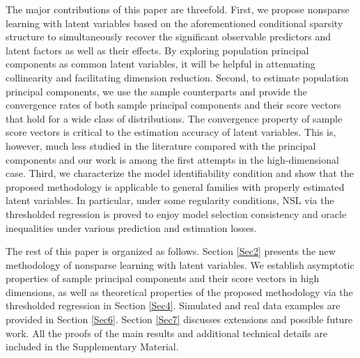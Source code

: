 \documentclass{statsoc}
\begin{document}
The major contributions of this paper are threefold. First, we propose nonsparse learning with latent variables based on the aforementioned conditional sparsity structure to simultaneously recover the significant observable predictors and latent factors as well as their effects. By exploring population principal components as common latent variables, it will be helpful in attenuating collinearity and facilitating dimension reduction. Second, to estimate population principal components, we use the sample counterparts and provide the convergence rates of both sample principal components and their score vectors that hold for a wide class of distributions. The convergence property of sample score vectors is critical to the estimation accuracy of latent variables. This is, however, much less studied in the literature compared with the principal components and our work is among the first attempts in the high-dimensional case. Third, we characterize the model identifiability condition and show that the proposed methodology is applicable to general families with properly estimated latent variables. In particular, under some regularity conditions, NSL via the thresholded regression is proved to enjoy model selection consistency and oracle inequalities under various prediction and estimation losses.



The rest of this paper is organized as follows. Section \ref{Sec2} presents the new methodology of nonsparse learning with latent variables. We establish asymptotic properties of sample principal components and their score vectors in high dimensions, as well as theoretical properties of the proposed methodology via the thresholded regression in Section \ref{Sec4}. Simulated and real data examples are provided in Section \ref{Sec6}. Section \ref{Sec7} discusses extensions and possible future work. All the proofs of the main results and additional technical details are included in the Supplementary Material.
\end{document}
